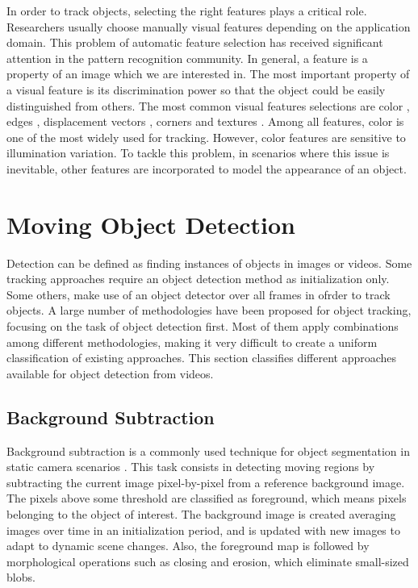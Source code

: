 In order to track objects, selecting the right features plays a critical role.
Researchers usually choose manually visual features depending on the application
domain. This problem of automatic feature selection has received significant
attention in the pattern recognition community. 
In general, a \gls{feature} is a property of an image which we are interested in.
The most important property of a visual feature is its discrimination power so
that the object could be easily distinguished from others. The most common visual
features selections are color  \cite{Paschos2001,Song1996}, edges \cite{Canny1986,
Bowyer2001}, displacement
vectors \cite{Black1996,Lucas1981a}, corners \cite{Harris1988} and textures
\cite{Haralick1973,Nickels1997,Mallat1989}. Among all features, color is one
of the most widely used for tracking. However, color features are sensitive to
illumination variation. To 
tackle this problem, in scenarios where this issue is inevitable, other
features are incorporated to model the appearance of an object.

\section{Moving Object Detection} 
\label{sec::detection}

Detection can be defined as finding instances of objects in images or videos. Some
tracking approaches require an object detection method as initialization only. Some others, make use of an object detector over all frames in ofrder to track objects.
A large number of methodologies have been proposed for object tracking, focusing
on the task of object detection first. Most of them apply combinations among
different methodologies, making it very difficult to create a uniform
classification of existing approaches. This section classifies
different approaches available for object detection from videos.

\subsection{Background Subtraction}

Background subtraction is a commonly used technique for object segmentation in
static camera scenarios \cite{McIvor2000}. This task consists in detecting moving
regions by subtracting the current image pixel-by-pixel from a reference
background image. The pixels above some threshold are classified as foreground,
which means pixels belonging to the object of interest. The background image is 
created  averaging images over time in an initialization period, and is updated
with new images to adapt to dynamic scene changes. Also, the foreground map is 
followed by morphological operations such as closing and erosion, which eliminate  
small-sized blobs.

